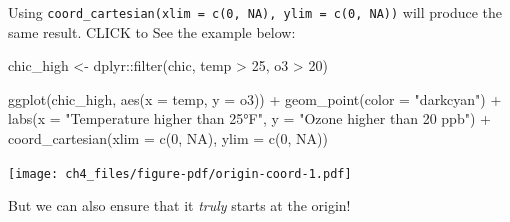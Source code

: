 \documentclass[
  letterpaper,
]{scrbook}
\newenvironment{Shaded}{\begin{snugshade}}{\end{snugshade}}
\newcommand{\AttributeTok}[1]{\textcolor[rgb]{0.40,0.45,0.13}{#1}}
\newcommand{\ConstantTok}[1]{\textcolor[rgb]{0.56,0.35,0.01}{#1}}
\newcommand{\DecValTok}[1]{\textcolor[rgb]{0.68,0.00,0.00}{#1}}
\newcommand{\FunctionTok}[1]{\textcolor[rgb]{0.28,0.35,0.67}{#1}}
\newcommand{\NormalTok}[1]{\textcolor[rgb]{0.00,0.23,0.31}{#1}}
\newcommand{\OtherTok}[1]{\textcolor[rgb]{0.00,0.23,0.31}{#1}}
\newcommand{\SpecialCharTok}[1]{\textcolor[rgb]{0.37,0.37,0.37}{#1}}
\newcommand{\StringTok}[1]{\textcolor[rgb]{0.13,0.47,0.30}{#1}}
\begin{document}
\begin{tcolorbox}[enhanced jigsaw, toprule=.15mm, bottomtitle=1mm, coltitle=black, breakable, colbacktitle=quarto-callout-tip-color!10!white, opacityback=0, toptitle=1mm, colframe=quarto-callout-tip-color-frame, titlerule=0mm, title=\textcolor{quarto-callout-tip-color}{\faLightbulb}\hspace{0.5em}{Another Way using
\texttt{coord\_cartesian(xlim\ =\ c(0,\ NA),\ ylim\ =\ c(0,\ NA))}}, bottomrule=.15mm, arc=.35mm, opacitybacktitle=0.6, leftrule=.75mm, left=2mm, rightrule=.15mm, colback=white]

Using \texttt{coord\_cartesian(xlim\ =\ c(0,\ NA),\ ylim\ =\ c(0,\ NA))}
will produce the same result. CLICK to See the example below:

\begin{Shaded}
\begin{Highlighting}[]
\NormalTok{chic\_high }\OtherTok{\textless{}{-}}\NormalTok{ dplyr}\SpecialCharTok{::}\FunctionTok{filter}\NormalTok{(chic, temp }\SpecialCharTok{\textgreater{}} \DecValTok{25}\NormalTok{, o3 }\SpecialCharTok{\textgreater{}} \DecValTok{20}\NormalTok{)}

\FunctionTok{ggplot}\NormalTok{(chic\_high, }\FunctionTok{aes}\NormalTok{(}\AttributeTok{x =}\NormalTok{ temp, }\AttributeTok{y =}\NormalTok{ o3)) }\SpecialCharTok{+}
  \FunctionTok{geom\_point}\NormalTok{(}\AttributeTok{color =} \StringTok{"darkcyan"}\NormalTok{) }\SpecialCharTok{+}
  \FunctionTok{labs}\NormalTok{(}\AttributeTok{x =} \StringTok{"Temperature higher than 25°F"}\NormalTok{,}
       \AttributeTok{y =} \StringTok{"Ozone higher than 20 ppb"}\NormalTok{) }\SpecialCharTok{+}
  \FunctionTok{coord\_cartesian}\NormalTok{(}\AttributeTok{xlim =} \FunctionTok{c}\NormalTok{(}\DecValTok{0}\NormalTok{, }\ConstantTok{NA}\NormalTok{), }\AttributeTok{ylim =} \FunctionTok{c}\NormalTok{(}\DecValTok{0}\NormalTok{, }\ConstantTok{NA}\NormalTok{))}
\end{Highlighting}
\end{Shaded}

\texttt{[image: ch4\_files/figure-pdf/origin-coord-1.pdf]}

\end{tcolorbox}

But we can also ensure that it \emph{truly} starts at the origin!
\end{document}
